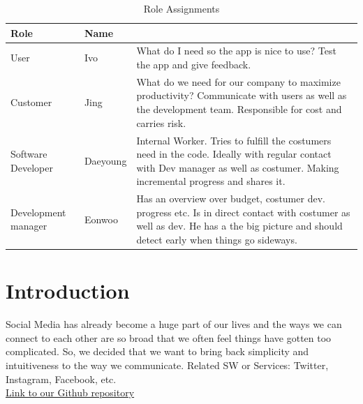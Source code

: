 \documentclass[conference]{IEEEtran}
\numberwithin{figure}{subsection}
\begin{document}
\begin{table}[ht!] \renewcommand\arraystretch{1.25}
  \begin{threeparttable}
      \caption{Role Assignments%
      \label{tab:table1}}    %
      \begin{tabular}{@{}l l>{\raggedright\arraybackslash}p{3.8cm}@{}}
      \toprule
      \bfseries Role & \bfseries Name & \multicolumn{1}{l}{\bfseries Task description and etc.} \\
      \midrule
      User & Ivo & What do I need so the app is nice to use? Test the app and give feedback.\\
      
      Customer & Jing & What do we need for our company to maximize productivity? Communicate with users as well as the development team. Responsible for cost and carries risk.\\
      
      Software Developer & Daeyoung & Internal Worker. Tries to fulfill the costumers need in the code. Ideally with regular contact with Dev manager as well as costumer. Making incremental progress and shares it.\\
      
      Development manager & Eonwoo & Has an overview over budget, costumer dev. progress etc. Is in direct contact with costumer as well as dev. He has a the big picture and should detect early when things go sideways.\\
      \bottomrule
      \end{tabular}
  \end{threeparttable}
\end{table}



\section{Introduction} 
Social Media has already become a huge part of our lives and the ways we can connect to each other are so broad that we often feel things have gotten too complicated. So, we decided that we want to bring back simplicity and intuitiveness to the way we communicate. Related SW or Services: Twitter, Instagram, Facebook, etc. \\

\href{https://github.com/ivovi2/SHOUTING-PINWALL}{Link to our Github repository}
\end{document}
